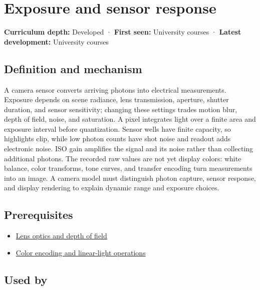 \hypertarget{appendix-92d45cdf2afc}{}\label{referencestart:appendix-92d45cdf2afc}
\section{Exposure and sensor response}\label{appendix-92d45cdf2afc-exposure-and-sensor-response}

\textbf{Curriculum depth:} Developed · \textbf{First seen:} University courses · \textbf{Latest development:} University courses

\subsection{Definition and mechanism}\label{appendix-92d45cdf2afc-definition-and-mechanism}

A camera sensor converts arriving photons into electrical measurements. Exposure depends on scene radiance, lens transmission, aperture, shutter duration, and sensor sensitivity; changing these settings trades motion blur, depth of field, noise, and saturation. A pixel integrates light over a finite area and exposure interval before quantization. Sensor wells have finite capacity, so highlights clip, while low photon counts have shot noise and readout adds electronic noise. ISO gain amplifies the signal and its noise rather than collecting additional photons. The recorded raw values are not yet display colors: white balance, color transforms, tone curves, and transfer encoding turn measurements into an image. A camera model must distinguish photon capture, sensor response, and display rendering to explain dynamic range and exposure choices.

\subsection{Prerequisites}\label{appendix-92d45cdf2afc-prerequisites}

\begin{itemize}
\tightlist
\item
  \hyperref[appendix-21f8456e2629]{Lens optics and depth of field}
\item
  \hyperref[appendix-a9f83ad40792]{Color encoding and linear-light operations}
\end{itemize}

\subsection{Used by}\label{appendix-92d45cdf2afc-used-by}

